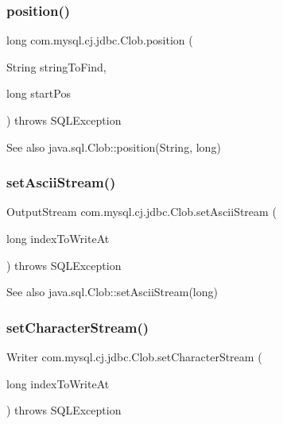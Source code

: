 \subsubsection{\texorpdfstring{position()}{position()}\hspace{0.1cm}{\footnotesize\ttfamily [2/2]}}
{\footnotesize\ttfamily long com.\+mysql.\+cj.\+jdbc.\+Clob.\+position (\begin{DoxyParamCaption}\item[{String}]{string\+To\+Find,  }\item[{long}]{start\+Pos }\end{DoxyParamCaption}) throws S\+Q\+L\+Exception}

\begin{DoxySeeAlso}{See also}
java.\+sql.\+Clob\+::position(\+String, long) 
\end{DoxySeeAlso}
\mbox{\label{classcom_1_1mysql_1_1cj_1_1jdbc_1_1_clob_a689233129f0a3ee09fdb60020a826b59}} 
\subsubsection{\texorpdfstring{set\+Ascii\+Stream()}{setAsciiStream()}}
{\footnotesize\ttfamily Output\+Stream com.\+mysql.\+cj.\+jdbc.\+Clob.\+set\+Ascii\+Stream (\begin{DoxyParamCaption}\item[{long}]{index\+To\+Write\+At }\end{DoxyParamCaption}) throws S\+Q\+L\+Exception}

\begin{DoxySeeAlso}{See also}
java.\+sql.\+Clob\+::set\+Ascii\+Stream(long) 
\end{DoxySeeAlso}
\mbox{\label{classcom_1_1mysql_1_1cj_1_1jdbc_1_1_clob_aa21bc09d5e81110704dd1c2c7fad6f75}} 
\subsubsection{\texorpdfstring{set\+Character\+Stream()}{setCharacterStream()}}
{\footnotesize\ttfamily Writer com.\+mysql.\+cj.\+jdbc.\+Clob.\+set\+Character\+Stream (\begin{DoxyParamCaption}\item[{long}]{index\+To\+Write\+At }\end{DoxyParamCaption}) throws S\+Q\+L\+Exception}

